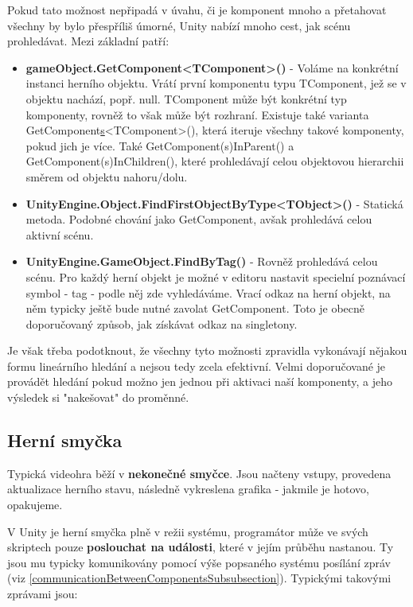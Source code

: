 Pokud tato možnost nepřipadá v úvahu, či je komponent mnoho a přetahovat všechny by bylo přespříliš úmorné, Unity nabízí mnoho cest, jak scénu prohledávat. Mezi základní patří:

\begin{itemize}
    \item \textbf{gameObject.GetComponent<TComponent>()} - Voláme na konkrétní instanci herního objektu. Vrátí první komponentu typu TComponent, jež se v objektu nachází, popř. null. TComponent může být konkrétní typ komponenty, rovněž to však může být rozhraní. Existuje také varianta GetComponent\underline{s}<TComponent>(), která iteruje všechny takové komponenty, pokud jich je více. Také GetComponent(s)InParent() a GetComponent(s)InChildren(), které prohledávají celou objektovou hierarchii směrem od objektu nahoru/dolu.
    \item \textbf{UnityEngine.Object.FindFirstObjectByType<TObject>()} - Statická metoda. Podobné chování jako GetComponent, avšak prohledává celou aktivní scénu. 
    \item \textbf{UnityEngine.GameObject.FindByTag()} - Rovněž prohledává celou scénu. Pro každý herní objekt je možné v editoru nastavit specielní poznávací symbol - tag - podle něj zde vyhledáváme. Vrací odkaz na herní objekt, na něm typicky ještě bude nutné zavolat GetComponent. Toto je obecně doporučovaný způsob, jak získávat odkaz na singletony.
\end{itemize}

Je však třeba podotknout, že všechny tyto možnosti zpravidla vykonávají nějakou formu lineárního hledání a nejsou tedy zcela efektivní. Velmi doporučované je provádět hledání pokud možno jen jednou při aktivaci naší komponenty, a jeho výsledek si "nakešovat" do proměnné.

\subsection{Herní smyčka}

Typická videohra běží v \textbf{nekonečné smyčce}. Jsou načteny vstupy, provedena aktualizace herního stavu, následně vykreslena grafika - jakmile je hotovo, opakujeme. 

V Unity je herní smyčka plně v režii systému, programátor může ve svých skriptech pouze \textbf{poslouchat na události}, které v jejím průběhu nastanou. Ty jsou mu typicky komunikovány pomocí výše popsaného systému posílání zpráv (viz \ref{communicationBetweenComponentsSubsubsection}).
Typickými takovými zprávami jsou:

